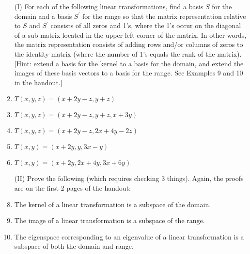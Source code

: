 \documentclass[10pt]{amsart}
\newcommand{\mytitle}{Similar Matrices Problems}
\begin{document}
\noindent{\huge{\bf \mytitle}}



\begin{enumerate}

\item[(I)] For each of the following linear transformations, find a basis $S$ for the domain and a basis $S^\prime$ for the range so that the matrix representation relative to $S$ and $S^\prime$ consists of all zeros and 1's, where the 1's occur on the diagonal of a sub matrix located in the upper left corner of the matrix.  In other words, the matrix representation consists of adding rows and/or columns of zeros to the identity matrix (where the number of 1's equals the rank of the matrix). [Hint: extend a basis for the kernel to a basis for the domain, and extend the images of these basis vectors to a basis for the range. See Examples 9 and 10 in the handout.]

\item $T(x,y,z)=(x+2y-z,y+z)$

\item $T(x,y,z)=(x+2y-z,y+z,x+3y)$

\item $T(x,y,z)=(x+2y-z,2x+4y-2z)$

\item $T(x,y)=(x+2y,y,3x-y)$

\item $T(x,y)=(x+2y,2x+4y,3x+6y)$

\item[(II)] Prove the following (which requires checking 3 things). Again, the proofs are on the first 2 pages of the handout:

\item The kernel of a linear transformation is a subspace of the domain.

\item The image of a linear transformation is a subspace of the range.

\item The eigenspace corresponding to an eigenvalue of a linear transformation is a subspace of both the domain and range.

\end{enumerate}
\end{document}
